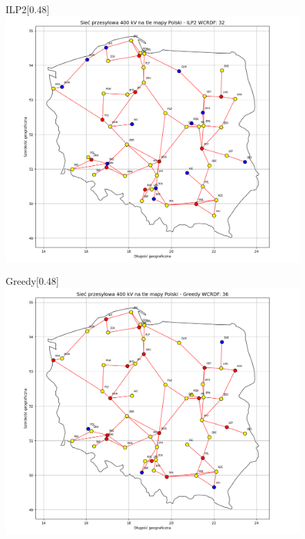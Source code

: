 \begin{figure}[htbp]
    \centering
    \begin{subcaptionbox}{ILP2\label{fig:img}}[0.48\linewidth]
        {\includegraphics[width=\linewidth]{assets/Poland/img.png}}
    \end{subcaptionbox}
    \hfill
    \begin{subcaptionbox}{Greedy\label{fig:img2}}[0.48\linewidth]
        {\includegraphics[width=\linewidth]{assets/Poland/img_2.png}}
    \end{subcaptionbox}

\end{figure}
